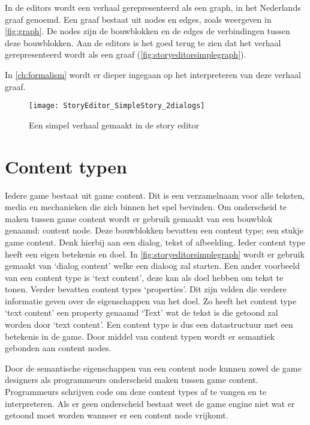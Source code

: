 In de editors wordt een verhaal gerepresenteerd als een graph, in het Nederlands graaf genoemd\cite{Aho1983}. Een graaf bestaat uit nodes en edges, zoals weergeven in \autoref{fig:graph}. De nodes zijn de bouwblokken en de edges de verbindingen tussen deze bouwblokken. Aan de editors is het goed terug te zien dat het verhaal gerepresenteerd wordt als een graaf (\autoref{fig:storyeditorsimplegraph}).

In \autoref{ch:formalism} wordt er dieper ingegaan op het interpreteren van deze verhaal graaf. 

\begin{figure}[H]
    \texttt{[image: StoryEditor\_SimpleStory\_2dialogs]}
    \caption{Een simpel verhaal gemaakt in de story editor}
    \label{fig:storyeditorsimplegraph}
    \centering
\end{figure}

\pagebreak

\section{Content typen}
\label{sec:contenttypen}
Iedere game bestaat uit game content. Dit is een verzamelnaam voor alle teksten, media en mechanieken die zich binnen het spel bevinden. Om onderscheid te maken tussen game content wordt er gebruik gemaakt van een bouwblok genaamd: content node. Deze bouwblokken bevatten een content type; een stukje game content. Denk hierbij aan een dialog, tekst of afbeelding. Ieder content type heeft een eigen betekenis en doel. In \autoref{fig:storyeditorsimplegraph} wordt er gebruik gemaakt van ‘dialog content’ welke een dialoog zal starten. Een ander voorbeeld van een content type is ‘text content’, deze kan als doel hebben om tekst te tonen. Verder bevatten content types ‘properties’. Dit zijn velden die verdere informatie geven over de eigenschappen van het doel. Zo heeft het content type ‘text content’ een property genaamd ‘Text' wat de tekst is die getoond zal worden door ‘text content’. Een content type is dus een datastructuur met een betekenis in de game. Door middel van content typen wordt er semantiek gebonden aan content nodes.

Door de semantische eigenschappen van een content node kunnen zowel de game designers als programmeurs onderscheid maken tussen game content. Programmeurs schrijven code om deze content types af te vangen en te interpreteren. Als er geen onderscheid bestaat weet de game engine niet wat er getoond moet worden wanneer er een content node vrijkomt.

